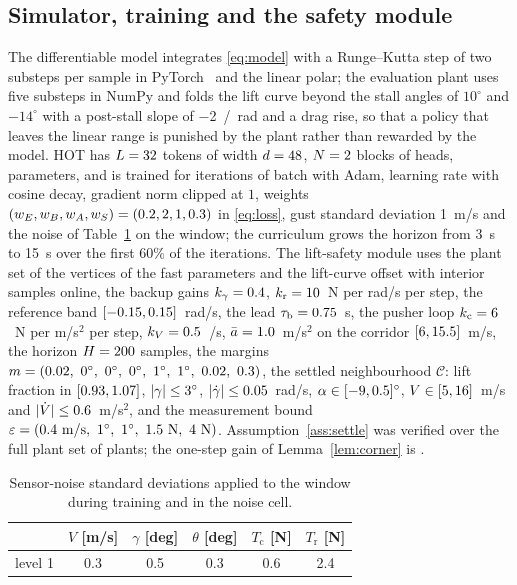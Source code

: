 \subsection{Simulator, training and the safety module}\label{sec:num}
The differentiable model integrates \eqref{eq:model} with a Runge--Kutta step of two substeps per sample in PyTorch~\cite{Paszke2019} and the linear polar; the evaluation plant uses five substeps in NumPy and folds the lift curve beyond the stall angles of $10^\circ$ and $-14^\circ$ with a post-stall slope of \SI{-2}{/rad} and a drag rise, so that a policy that leaves the linear range is punished by the plant rather than rewarded by the model. HOT has $L=32{}$ tokens of width $d=48{}$, $N=2{}$ blocks of \numHeads{} heads, \numParams{} parameters, and is trained for \numIters{} iterations of batch \numBatch{} with Adam, learning rate \numLr{} with cosine decay, gradient norm clipped at $1$, weights $(w_E,w_B,w_A,w_S)=(0.2,2,1,0.3)$ in \eqref{eq:loss}, gust standard deviation \SI{1}{m/s} and the noise of Table~\ref{tab:noise} on the window; the curriculum grows the horizon from \SI{3}{s} to \SI{15}{s} over the first $60\%$ of the iterations. The lift-safety module uses the plant set of the \numPlantsOnline{} vertices of the fast parameters and the lift-curve offset with \numSamplesOnline{} interior samples online, the backup gains $k_\gamma=0.4$, $k_{\mathrm r}=10$~N per rad/s per step, the reference band $[-0.15,0.15]$~rad/s, the lead $\tau_{\mathrm b}=0.75$~s, the pusher loop $k_{\mathrm c}=6$~N per m/s$^2$ per step, $k_V=0.5$~/s, $\bar a=1.0$~m/s$^2$ on the corridor $[6,15.5]$~m/s, the horizon $H=200{}$ samples, the margins $m=(0.02,\ 0^\circ,\ 0^\circ,\ 0^\circ,\ 1^\circ,\ 1^\circ,\ 0.02,\ 0.3)$, the settled neighbourhood $\mathcal C$: lift fraction in $[0.93,1.07]$, $|\gamma|\le3^\circ$, $|\dot\gamma|\le0.05$~rad/s, $\alpha\in[-9,0.5]^\circ$, $V\in[5,16]$~m/s and $|\dot V|\le0.6$~m/s$^2$, and the measurement bound $\varepsilon=(0.4\ \mathrm{m/s},\ 1^\circ,\ 1^\circ,\ 1.5\ \mathrm N,\ 4\ \mathrm N)$. Assumption~\ref{ass:settle} was verified over the full plant set of \numPlantsFull{} plants; the one-step gain of Lemma~\ref{lem:corner} is \numKrGain{}.
\begin{table}[t]\centering\footnotesize
\caption{Sensor-noise standard deviations applied to the window during training and in the noise cell.}\label{tab:noise}
\begin{tabular}{lccccc}\toprule
& $V$ [m/s] & $\gamma$ [deg] & $\theta$ [deg] & $T_{\mathrm c}$ [N] & $T_{\mathrm r}$ [N]\\\midrule
level 1 & 0.3 & 0.5 & 0.3 & 0.6 & 2.4\\
\bottomrule\end{tabular}\end{table}

